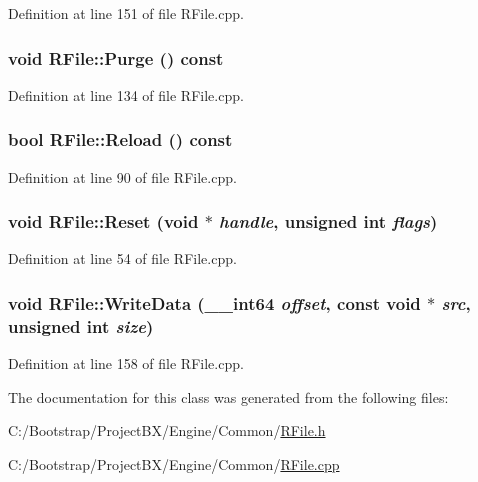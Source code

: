 Definition at line 151 of file RFile.cpp.\hypertarget{class_r_file_e8e9458fd38f8c5a183b897e167fce3a}{
\subsubsection[{Purge}]{\setlength{\rightskip}{0pt plus 5cm}void RFile::Purge () const}}
\label{class_r_file_e8e9458fd38f8c5a183b897e167fce3a}




Definition at line 134 of file RFile.cpp.\hypertarget{class_r_file_e2b38cee29eed7f4469aabc6a5eb3a6e}{
\subsubsection[{Reload}]{\setlength{\rightskip}{0pt plus 5cm}bool RFile::Reload () const}}
\label{class_r_file_e2b38cee29eed7f4469aabc6a5eb3a6e}




Definition at line 90 of file RFile.cpp.\hypertarget{class_r_file_4063ce34c2c766729da4e29ca2de79e3}{
\subsubsection[{Reset}]{\setlength{\rightskip}{0pt plus 5cm}void RFile::Reset (void $\ast$ {\em handle}, \/  unsigned int {\em flags})}}
\label{class_r_file_4063ce34c2c766729da4e29ca2de79e3}




Definition at line 54 of file RFile.cpp.\hypertarget{class_r_file_0ae8b25ea2cdbe65804418cb03f4b156}{
\subsubsection[{WriteData}]{\setlength{\rightskip}{0pt plus 5cm}void RFile::WriteData ({\bf \_\-\_\-int64} {\em offset}, \/  const void $\ast$ {\em src}, \/  unsigned int {\em size})}}
\label{class_r_file_0ae8b25ea2cdbe65804418cb03f4b156}




Definition at line 158 of file RFile.cpp.

The documentation for this class was generated from the following files:\begin{CompactItemize}
\item 
C:/Bootstrap/ProjectBX/Engine/Common/\hyperlink{_r_file_8h}{RFile.h}\item 
C:/Bootstrap/ProjectBX/Engine/Common/\hyperlink{_r_file_8cpp}{RFile.cpp}\end{CompactItemize}
